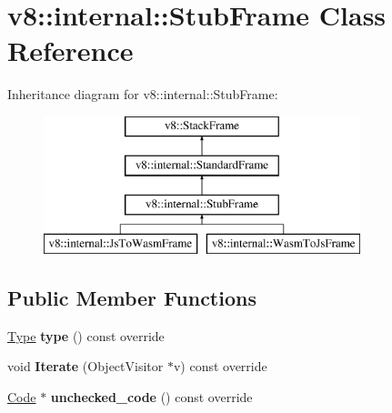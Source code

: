 \hypertarget{classv8_1_1internal_1_1_stub_frame}{}\section{v8\+:\+:internal\+:\+:Stub\+Frame Class Reference}
\label{classv8_1_1internal_1_1_stub_frame}
Inheritance diagram for v8\+:\+:internal\+:\+:Stub\+Frame\+:\begin{figure}[H]
\begin{center}
\leavevmode
\includegraphics[height=4.000000cm]{classv8_1_1internal_1_1_stub_frame}
\end{center}
\end{figure}
\subsection*{Public Member Functions}
\begin{DoxyCompactItemize}
\item 
\hyperlink{classv8_1_1internal_1_1_type}{Type} {\bfseries type} () const  override\hypertarget{classv8_1_1internal_1_1_stub_frame_ac7196c0b0d6ede94cdf04ccb7e62bb10}{}\label{classv8_1_1internal_1_1_stub_frame_ac7196c0b0d6ede94cdf04ccb7e62bb10}

\item 
void {\bfseries Iterate} (Object\+Visitor $\ast$v) const  override\hypertarget{classv8_1_1internal_1_1_stub_frame_a01e705ae29616a4591f980f40f509759}{}\label{classv8_1_1internal_1_1_stub_frame_a01e705ae29616a4591f980f40f509759}

\item 
\hyperlink{classv8_1_1internal_1_1_code}{Code} $\ast$ {\bfseries unchecked\+\_\+code} () const  override\hypertarget{classv8_1_1internal_1_1_stub_frame_addfdb846ca53ef42ab33a41a77aa1c74}{}\label{classv8_1_1internal_1_1_stub_frame_addfdb846ca53ef42ab33a41a77aa1c74}

\end{DoxyCompactItemize}
